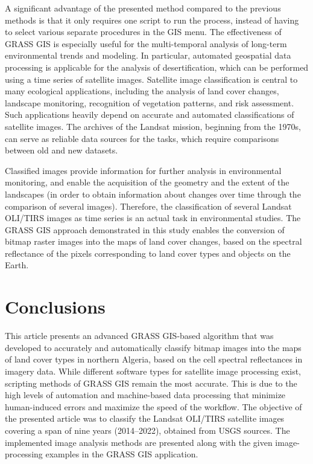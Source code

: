 \documentclass[asi,article,accept,pdftex,moreauthors]{Definitions/mdpi}
\begin{document}
{A significant advantage of the presented method compared to the previous methods is that it only requires one script to run the process, instead of having to select various separate procedures in the GIS menu. }The effectiveness of GRASS GIS is especially useful for the multi-temporal analysis of {long-term} environmental trends{ and modeling. In particular, automated geospatial data processing is applicable for the analysis of} desertification, {which can be performed }using a time series of satellite images{. }Satellite image classification is central to many ecological applications, including the analysis of land cover changes, landscape monitoring, {recognition of }vegetation {patterns, and} risk assessment{. }Such applications heavily depend on accurate and automated classifications of satellite images{. The} archives of the Landsat{ mission, beginning from the 1970s, can serve as reliable data sources for the }tasks, {which }require {comparisons} between old {and new }datasets{.} 

Classified images provide information for further {analysis} in environmental monitoring{, }and enable the acquisition of the geometry {and the extent }of {the }landscapes {(in order }to obtain information {about} changes over time through the comparison of several images){. }Therefore, the classification of several Landsat OLI/TIRS images as time series is {an actual} task {in environmental studies}. The  GRASS GIS approach demonstrated in this study enables the conversion of bitmap raster images into {the }maps of land cover changes, based on the spectral reflectance of the {pixels corresponding to }land cover types {and} objects on the Earth.

\section{Conclusions}
{This} article {presents} an advanced GRASS GIS-based algorithm that was developed to accurately and automatically classify bitmap images into the maps of land cover types in northern Algeria, based on the cell spectral reflectances in imagery data. While different software types for satellite image processing exist, scripting methods {of } GRASS GIS remain the most accurate{. This is} due to the high levels of automation {and machine-based data processing }that minimize human-induced errors and maximize the speed of {the workflow}. The objective of the presented article was to classify the  Landsat OLI/TIRS satellite images covering a span of nine years {(2014--2022)}, obtained from  USGS sources. The implemented image analysis methods are presented along with the {given } image-processing examples in the GRASS GIS {application}. 
\end{document}

